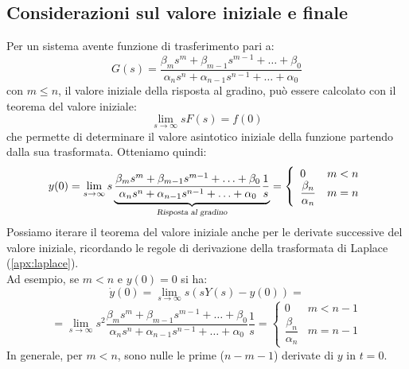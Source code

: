 \documentclass[a4paper]{report}
\begin{document}
\subsection{Considerazioni sul valore iniziale e finale}
Per un sistema avente funzione di trasferimento pari a:
\begin{equation}
  G(s)=\dfrac{\beta_ms^m+\beta_{m-1}s^{m-1}+\ldots+\beta_0}{\alpha_ns^n
    + \alpha_{n-1}s^{n-1}+\ldots+\alpha_0}
\end{equation}
con $m \le n$, il valore iniziale della risposta al gradino, pu\`o
essere calcolato con il teorema del valore iniziale:
\begin{equation}\label{eq:teoremaDelValoreIniziale}
  \lim_{s \to \infty} sF(s) = f(0)
\end{equation}
che permette di determinare il valore asintotico iniziale della
funzione partendo dalla sua trasformata. Otteniamo quindi:
\begin{displaymath}
  y(0)=\lim_{s \to \infty}
  s\underbrace{\frac{\beta_ms^m+\beta_{m-1}s^{m-1}+\ldots+\beta_0}{\alpha_ns^n+\alpha_{n-1}
      s^{n-1}+\ldots+\alpha_0}\dfrac{1}{s}}_{\textsl{Risposta al
      gradino}} = \left\{ \begin{array}{ll}0 & m < n
    \\ \dfrac{\beta_n}{\alpha_n} & m = n\end{array}\right.
\end{displaymath}
Possiamo iterare il teorema del valore iniziale anche per le derivate
successive del valore iniziale, ricordando le regole di derivazione
della trasformata di Laplace (\ref{apx:laplace}).\\
Ad esempio, se $m < n$ e $y(0) = 0$ si ha:
\begin{displaymath}
  \dot{y}(0)=\lim_{s \to \infty}s(sY(s)-y(0))=
\end{displaymath}
\begin{displaymath}
  =\lim_{s \to \infty}s^2\dfrac{\beta_ms^m+\beta_{m-1}s^{m-1} +
    \ldots+\beta_0}{\alpha_ns^n +
    \alpha_{n-1}s^{n-1}+\ldots+\alpha_0}\frac{1}{s} =
  \left\{ \begin{array}{ll}0 & m<n-1 \\
    \dfrac{\beta_n}{\alpha_n} & m=n-1\end{array}\right.
\end{displaymath}
In generale, per $m < n$, sono nulle le prime ($n-m-1$) derivate di
$y$ in $t = 0$.
\end{document}
